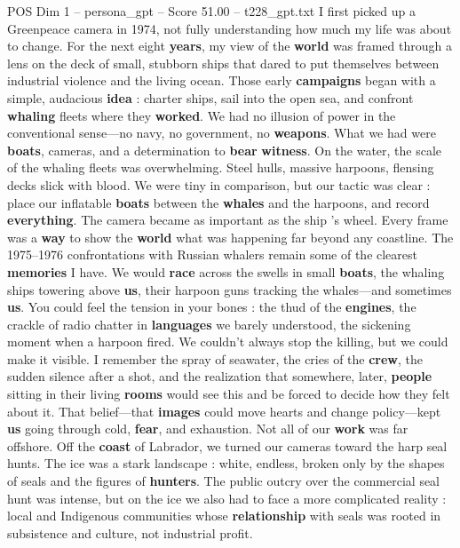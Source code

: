 \begin{textsample}{POS Dim 1 – persona\_gpt – Score 51.00 – t228\_gpt.txt}  \label{ex:f1_pos_022}
I first picked up a Greenpeace camera in 1974, not fully understanding how much my life was about to change.
For the next eight \textbf{years}, my view of the \textbf{world} was framed through a lens on the deck of small, stubborn ships that dared to put themselves between industrial violence and the living ocean.
Those early \textbf{campaigns} began with a simple, audacious \textbf{idea} : charter ships, sail into the open sea, and confront \textbf{whaling} fleets where they \textbf{worked}.
We had no illusion of power in the conventional sense—no navy, no government, no \textbf{weapons}.
What we had were \textbf{boats}, cameras, and a determination to \textbf{bear} \textbf{witness}.
On the water, the scale of the whaling fleets was overwhelming.
Steel hulls, massive harpoons, flensing decks slick with blood.
We were tiny in comparison, but our tactic was clear : place our inflatable \textbf{boats} between the \textbf{whales} and the harpoons, and record \textbf{everything}.
The camera became as important as the ship ’s wheel.
Every frame was a \textbf{way} to show the \textbf{world} what was happening far beyond any coastline.
The 1975–1976 confrontations with Russian whalers remain some of the clearest \textbf{memories} I have.
We would \textbf{race} across the swells in small \textbf{boats}, the whaling ships towering above \textbf{us}, their harpoon guns tracking the whales—and sometimes \textbf{us}.
You could feel the tension in your bones : the thud of the \textbf{engines}, the crackle of radio chatter in \textbf{languages} we barely understood, the sickening moment when a harpoon fired.
We couldn't always stop the killing, but we could make it visible.
I remember the spray of seawater, the cries of the \textbf{crew}, the sudden silence after a shot, and the realization that somewhere, later, \textbf{people} sitting in their living \textbf{rooms} would see this and be forced to decide how they felt about it.
That belief—that \textbf{images} could move hearts and change policy—kept \textbf{us} going through cold, \textbf{fear}, and exhaustion.
Not all of our \textbf{work} was far offshore.
Off the \textbf{coast} of Labrador, we turned our cameras toward the harp seal hunts.
The ice was a stark landscape : white, endless, broken only by the shapes of seals and the figures of \textbf{hunters}.
The public outcry over the commercial seal hunt was intense, but on the ice we also had to face a more complicated reality : local and Indigenous communities whose \textbf{relationship} with seals was rooted in subsistence and culture, not industrial profit.

\end{textsample}
